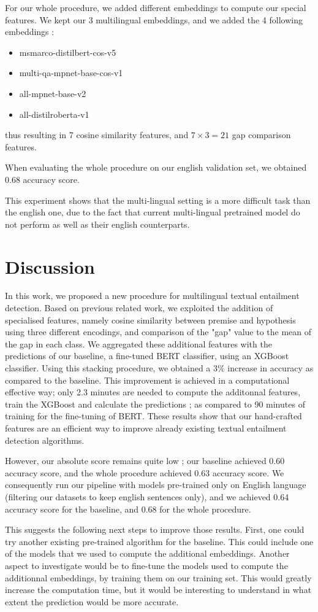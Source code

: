 \documentclass[final]{cvpr}
\begin{document}
For our whole procedure, we added different embeddings to compute our special features. We kept our 3 multilingual embeddings, and we added the 4 following embeddings : 

\begin{itemize}
    \item msmarco-distilbert-cos-v5
    \item multi-qa-mpnet-base-cos-v1
    \item all-mpnet-base-v2
    \item all-distilroberta-v1
\end{itemize}

thus resulting in 7 cosine similarity features, and $7 \times 3 = 21$ gap comparison features.

When evaluating the whole procedure on our english validation set, we obtained 0.68 accuracy score.

This experiment shows that the multi-lingual setting is a more difficult task than the english one, due to the fact that current multi-lingual pretrained model do not perform as well as their english counterparts.

\section{Discussion}

In this work, we proposed a new procedure for multilingual textual entailment detection. Based on previous related work, we exploited the addition of specialised features, namely cosine similarity between premise and hypothesis using three different encodings, and comparison of the "gap" value to the mean of the gap in each class. We aggregated these additional features with the predictions of our baseline, a fine-tuned BERT classifier, using an XGBoost classifier. Using this stacking procedure, we obtained a $3\%$ increase in accuracy as compared to the baseline. This improvement is achieved in a computational effective way; only 2.3 minutes are needed to compute the additonnal features, train the XGBoost and calculate the predictions ; as compared to 90 minutes of training for the fine-tuning of BERT. These results show that our hand-crafted features are an efficient way to improve already existing textual entailment detection algorithms.

However, our absolute score remains quite low ; our baseline achieved 0.60 accuracy score, and the whole procedure achieved 0.63 accuracy score. We consequently run our pipeline with models pre-trained only on English language (filtering our datasets to keep english sentences only), and we achieved 0.64 accuracy score for the baseline, and 0.68 for the whole procedure.

This suggests the following next steps to improve those results. First, one could try another existing pre-trained algorithm for the baseline. This could include one of the models that we used to compute the additional embeddings. Another aspect to investigate would be to fine-tune the models used to compute the additionnal embeddings, by training them on our training set. This would greatly increase the computation time, but it would be interesting to understand in what extent the prediction would be more accurate.


\printbibliography
\end{document}
